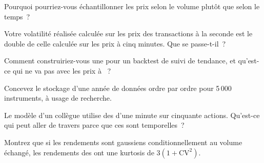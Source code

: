\begin{interviewq}\label{iq:rs:market-data-for-research:1}
Pourquoi pourriez-vous échantillonner les prix selon le volume plutôt que selon le temps~?
\end{interviewq}

\begin{interviewq}\label{iq:rs:market-data-for-research:2}
Votre volatilité réalisée calculée sur les prix des transactions à la seconde est le double de celle calculée sur les prix à cinq minutes. Que se passe-t-il~?
\end{interviewq}

\begin{interviewq}\label{iq:rs:market-data-for-research:3}
Comment construiriez-vous une  pour un backtest de suivi de tendance, et qu'est-ce qui ne va pas avec les prix à ~?
\end{interviewq}

\begin{interviewq}\label{iq:rs:market-data-for-research:4}
Concevez le stockage d'une année de données ordre par ordre pour 5\,000 instruments, à usage de recherche.
\end{interviewq}

\begin{interviewq}\label{iq:rs:market-data-for-research:5}
Le modèle d'un collègue utilise des  d'une minute sur cinquante actions. Qu'est-ce qui peut aller de travers parce que ces  sont temporelles~?
\end{interviewq}

\begin{interviewq}\label{iq:rs:market-data-for-research:6}
Montrez que si les rendements sont gaussiens conditionnellement au volume échangé, les rendements des  ont une kurtosis de $3(1 + \mathrm{CV}^2)$.
\end{interviewq}
